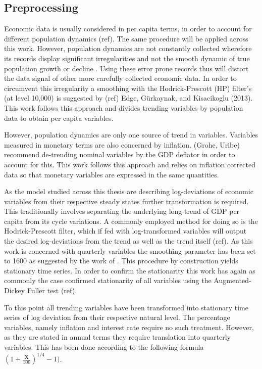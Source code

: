 \documentclass[12pt,a4paper,english]{article} %
\newcommand{\matr}[1]{\mathbf{#1}} %
\begin{document}
	\subsection{Preprocessing}
	
	Economic data is usually considered in per capita terms, in order to account for different population dynamics (ref). The same procedure will be applied across this work. However, population dynamics are not constantly collected wherefore its records display significant irregularities and not the smooth dynamic of true population growth or decline \cite{pfeifer_guide_2021}. Using these error prone records thus will distort the data signal of other more carefully collected economic data. In order to circumvent this irregularity a smoothing with the Hodrick-Prescott (HP) filter's (at level 10,000) is suggested by (ref) Edge, Gürkaynak, and Kisacikoglu (2013). This work follows this approach and divides trending variables by population data to obtain per capita variables.
	
	However, population dynamics are only one source of trend in variables. Variables measured in monetary terms are also concerned by inflation. \cite{pfeifer_guide_2021} (Grohe, Uribe) recommend de-trending nominal variables by the GDP deflator in order to account for this. This work follows this approach and relies on inflation corrected data so that monetary variables are expressed in the same quantities.
	
	As the model studied across this thesis are describing log-deviations of economic variables from their respective steady states further transformation is required. This traditionally involves separating the underlying long-trend of GDP per capita from its cycle variations. A commonly employed method for doing so is the Hodrick-Prescott filter, which if fed with log-transformed variables will output the desired log-deviations from the trend as well as the trend itself (ref). As this work is concerned with quarterly variables the smoothing parameter has been set to 1600 as suggested by the work of \cite{ravn_adjusting_2002}. This procedure by construction yields stationary time series. In order to confirm the stationarity this work has again as commonly the case confirmed stationarity of all variables using the Augmented-Dickey Fuller test (ref).
	
	To this point all trending variables have been transformed into stationary time series of log deviation from their respective natural level. The percentage variables, namely inflation and interest rate require no such treatment. However, as they are stated in annual terms they require translation into quarterly variables. This has been done according to the following formula $(1 + \frac{\matr{X}}{100})^{1/4} - 1)$.
	
\end{document}
